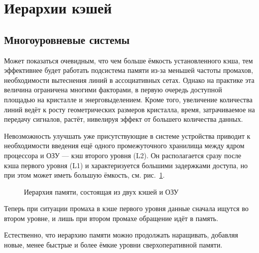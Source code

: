 \section{Иерархии кэшей}

\subsection{Многоуровневые системы}

Может показаться очевидным, что чем больше ёмкость установленного кэша, тем эффективнее будет работать подсистема памяти из-за меньшей частоты промахов, необходимости вытеснения линий в ассоциативных сетах. Однако на практике эта величина ограничена многими факторами, в первую очередь доступной площадью на кристалле и энерговыделением. Кроме того, увеличение количества линий ведёт к росту геометрических размеров кристалла, время, затрачиваемое на передачу сигналов, растёт, нивелируя эффект от большего количества данных.

Невозможность улучшать уже присутствующие в системе устройства приводит к необходимости введения ещё одного промежуточного хранилища между ядром процессора и ОЗУ --- кэш второго уровня (L2). Он располагается сразу после кэша первого уровня (L1) и характеризуется большими задержками доступа, но при этом может иметь большую ёмкость, см. рис.~\ref{fig:l1l2}.

\begin{figure}[htb]
    \centering
    \caption{Иерархия памяти, состоящая из двух кэшей и ОЗУ}
    \label{fig:l1l2}
\end{figure}


Теперь при ситуации промаха в кэше первого уровня данные сначала ищутся во втором уровне, и лишь при втором промахе обращение идёт в память. 

Естественно, что иерархию памяти можно продолжать наращивать, добавляя новые, менее быстрые и более ёмкие уровни сверхоперативной памяти. %

